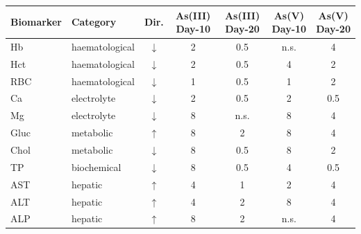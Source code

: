 \begin{tabular}{llccccc}
  \toprule
  Biomarker & Category & Dir. & As(III) Day-10 & As(III) Day-20 & As(V) Day-10 & As(V) Day-20 \\
  \midrule
  Hb & haematological & $\downarrow$ & 2 & 0.5 & n.s. & 4 \\
  Hct & haematological & $\downarrow$ & 2 & 0.5 & 4 & 2 \\
  RBC & haematological & $\downarrow$ & 1 & 0.5 & 1 & 2 \\
  Ca & electrolyte & $\downarrow$ & 2 & 0.5 & 2 & 0.5 \\
  Mg & electrolyte & $\downarrow$ & 8 & n.s. & 8 & 4 \\
  Gluc & metabolic & $\uparrow$ & 8 & 2 & 8 & 4 \\
  Chol & metabolic & $\downarrow$ & 8 & 0.5 & 8 & 2 \\
  TP & biochemical & $\downarrow$ & 8 & 0.5 & 4 & 0.5 \\
  AST & hepatic & $\uparrow$ & 4 & 1 & 2 & 4 \\
  ALT & hepatic & $\uparrow$ & 4 & 2 & 8 & 4 \\
  ALP & hepatic & $\uparrow$ & 8 & 2 & n.s. & 4 \\
  \bottomrule
\end{tabular}
